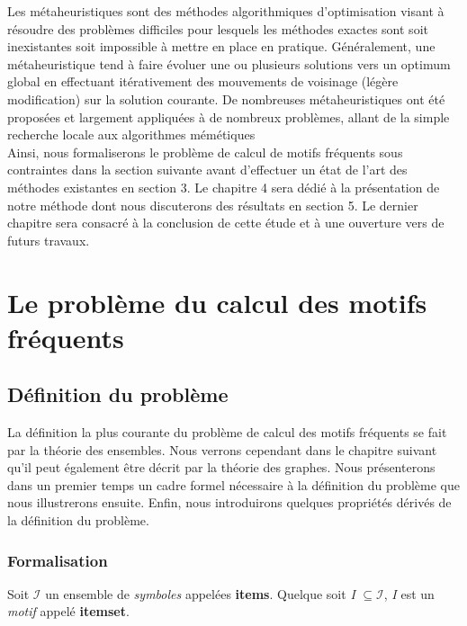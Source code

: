 \documentclass[a4paper,10pt]{report}
\begin{document}
\hspace{0.15cm}Les métaheuristiques sont des méthodes algorithmiques d'optimisation visant à résoudre des problèmes difficiles pour lesquels les méthodes exactes sont soit inexistantes soit impossible à mettre en place en pratique. Généralement, une métaheuristique tend à faire évoluer une ou plusieurs solutions vers un optimum global en effectuant itérativement des mouvements de voisinage (légère modification) sur la solution courante. De nombreuses métaheuristiques ont été proposées et largement appliquées à de nombreux problèmes, allant de la simple recherche locale aux algorithmes mémétiques \\

\hspace{0.15cm}Ainsi, nous formaliserons le problème de calcul de motifs fréquents sous contraintes dans la section suivante avant d'effectuer un état de l'art des méthodes existantes en section 3. Le chapitre 4 sera dédié à la présentation de notre méthode dont nous discuterons des résultats en section 5. Le dernier chapitre sera consacré à la conclusion de cette étude et à une ouverture vers de futurs travaux.

\newpage
\chapter{Le problème du calcul des motifs fréquents}

\section{Définition du problème}
	La définition la plus courante du problème de calcul des motifs fréquents se fait par la théorie des ensembles. Nous verrons cependant dans le chapitre suivant qu'il peut également être décrit par la théorie des graphes. Nous présenterons dans un premier temps un cadre formel nécessaire à la définition du problème que nous illustrerons ensuite. Enfin, nous introduirons quelques propriétés dérivés de la définition du problème.

\subsection{Formalisation}
	Soit $\mathcal{I}$ un ensemble de \emph{symboles} appelées \textbf{items}. Quelque soit \emph{I} $ \subseteq \mathcal{I}$, \emph{I} est un \emph{motif} appelé \textbf{itemset}. \\
\end{document}
